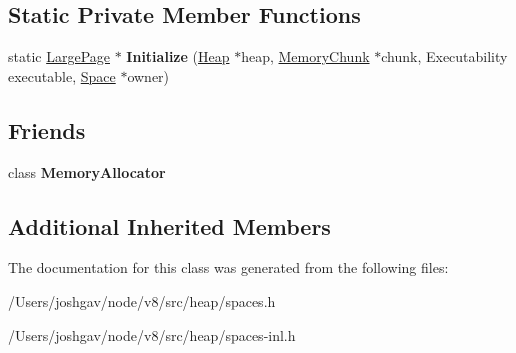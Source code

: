 \subsection*{Static Private Member Functions}
\begin{DoxyCompactItemize}
\item 
static \hyperlink{classv8_1_1internal_1_1_large_page}{Large\+Page} $\ast$ {\bfseries Initialize} (\hyperlink{classv8_1_1internal_1_1_heap}{Heap} $\ast$heap, \hyperlink{classv8_1_1internal_1_1_memory_chunk}{Memory\+Chunk} $\ast$chunk, Executability executable, \hyperlink{classv8_1_1internal_1_1_space}{Space} $\ast$owner)\hypertarget{classv8_1_1internal_1_1_large_page_a7ce99ae8892c2a23d7f092761f020027}{}\label{classv8_1_1internal_1_1_large_page_a7ce99ae8892c2a23d7f092761f020027}

\end{DoxyCompactItemize}
\subsection*{Friends}
\begin{DoxyCompactItemize}
\item 
class {\bfseries Memory\+Allocator}\hypertarget{classv8_1_1internal_1_1_large_page_aea1126d5a764b0d074d2d6edb5a09f23}{}\label{classv8_1_1internal_1_1_large_page_aea1126d5a764b0d074d2d6edb5a09f23}

\end{DoxyCompactItemize}
\subsection*{Additional Inherited Members}


The documentation for this class was generated from the following files\+:\begin{DoxyCompactItemize}
\item 
/\+Users/joshgav/node/v8/src/heap/spaces.\+h\item 
/\+Users/joshgav/node/v8/src/heap/spaces-\/inl.\+h\end{DoxyCompactItemize}
